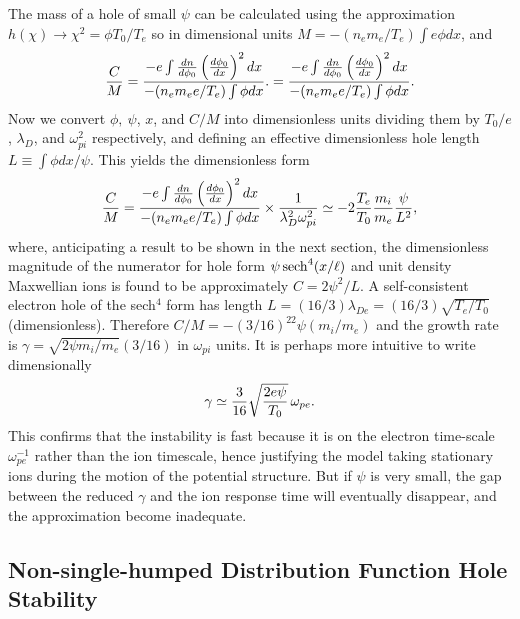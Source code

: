 \documentclass[12pt]{article}
\begin{document}
The mass of a hole of small $\psi$ can be calculated using the
approximation $h(\chi)\to \chi^2=\phi T_0/T_e$ so in dimensional units
$M=-(n_em_e/T_e)\int e\phi dx$, and
\begin{equation}
  \label{eq:CbyM}
  {C\over M}= {-e\int {dn\over d\phi_0}\left(d\phi_0\over dx\right)^2 dx
    \over -(n_em_ee/T_e)\int \phi dx }.
  ={-e\int {dn\over d\phi_0}\left(d\phi_0\over dx\right)^2 dx
    \over -(n_em_ee/T_e)\int \phi dx }.
\end{equation}
Now we convert $\phi,\ \psi$, $x$, and $C/M$ into dimensionless units
dividing them by $T_0/e$, $\lambda_D$, and $\omega_{pi}^2$
respectively, and defining an effective dimensionless hole length
$L\equiv\int\phi dx/\psi$. This yields the dimensionless form
\begin{equation}
  \label{eq:CbyMless}
   {C\over M}= {-e\int {dn\over d\phi_0}\left(d\phi_0\over dx\right)^2 dx
     \over -(n_em_ee/T_e)\int \phi dx } \times {1\over
     \lambda_D^2 \omega_{pi}^2}
   \simeq -2 {T_e\over T_0} {m_i\over m_e} {\psi \over L^2},
 \end{equation}
 where, anticipating a result to be shown in the next section, the
 dimensionless magnitude of the numerator for hole form
 $\psi\, {\rm sech}^4(x/\ell)$ and unit density Maxwellian ions
 is found to be approximately $C=2\psi^2/L$.  A self-consistent electron
 hole of the sech$^4$ form has length
 $L=(16/3)\lambda_{De}= (16/3)\sqrt{T_e/T_0}$ (dimensionless).
 Therefore $C/M=-(3/16)^22\psi (m_i/m_e)$ and the growth rate is
 $\gamma=\sqrt{2\psi m_i/m_e}(3/16)$ in $\omega_{pi}$ units. It is
 perhaps more intuitive to write dimensionally
 \begin{equation}
   \label{eq:gamma}
 \gamma\simeq{3\over 16}\sqrt{2e\psi\over T_0}\,\omega_{pe}.   
 \end{equation}
 This confirms that the
 instability is fast because it is on the electron time-scale
 $\omega_{pe}^{-1}$ rather than the ion timescale, hence justifying
 the model taking stationary ions during the motion of the potential
 structure. But if $\psi$ is very small, the gap between the reduced
 $\gamma$ and the ion response time will eventually disappear, and the
 approximation become inadequate.



\subsection{Non-single-humped Distribution Function Hole Stability}
\label{section2.3}
\end{document}
